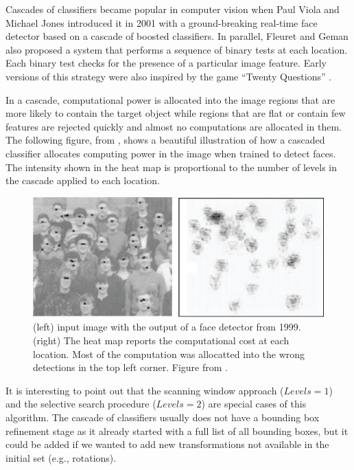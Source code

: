 Cascades of classifiers became popular in computer vision when Paul Viola and Michael Jones \cite{Viola01} introduced it in 2001 with a ground-breaking real-time face detector based on a cascade of boosted classifiers. In parallel, Fleuret and Geman \cite{Fleuret2001} also proposed a system that performs a sequence of binary tests at each location. Each binary test checks for the presence of a particular image feature. Early versions of this strategy were also inspired by the game ``Twenty Questions''  \cite{Geman1994}.

In a cascade, computational power is allocated into the image regions that are more likely to contain the target object while regions that are flat or contain few features are rejected quickly and almost no computations are allocated in them. The following figure, from \cite{Fleuret2001}, shows a beautiful illustration of how a cascaded classifier allocates computing power in the image when trained to detect faces. The intensity shown in the heat map is proportional to the number of levels in the cascade applied to each location.

\begin{figure}
    \centerline{
        \includegraphics[width=.8\linewidth]{figures/object_recognition/cascade.eps}
    }
    \caption{(left) input image with the output of a face detector from 1999. (right) The heat map reports the computational cost at each location. Most of the computation was allocatted into the wrong detections in the top left corner. Figure from \cite{Fleuret2001}.}
\end{figure}

It is interesting to point out that the scanning window approach ($Levels = 1$) and the selective search procedure ($Levels = 2$) are special cases of this algorithm. The cascade of classifiers usually does not have a bounding box refinement stage as it already started with a full list of all bounding boxes, but it could be added if we wanted to add new transformations not available in the initial set (e.g., rotations).


